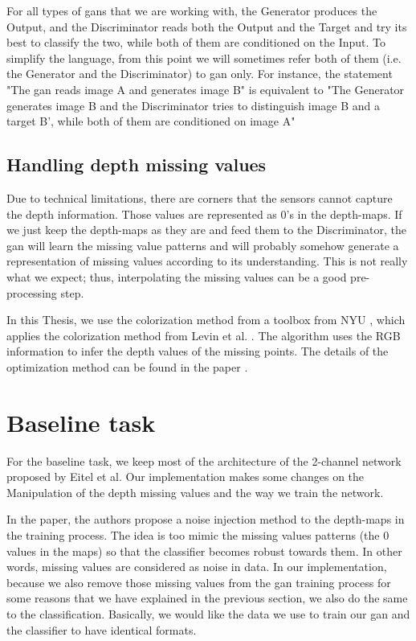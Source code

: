 For all types of \acrshort{gan}s that we are working with, the Generator produces the
Output, and the Discriminator reads both the Output and the Target and try its best to
classify the two, while both of them are conditioned on the Input. To simplify the
language, from this point we will sometimes refer both of them (i.e. the Generator and the
Discriminator) to \acrshort{gan} only. For instance, the statement "The \acrshort{gan} reads
image A and generates image B" is equivalent to "The Generator generates image B and the
Discriminator tries to distinguish image B and a target B', while both of them are
conditioned on image A"

\subsection{Handling depth missing values }

Due to technical limitations, there are corners that the sensors cannot capture the depth
information. Those values are represented as 0's in the depth-maps. If we just keep the
depth-maps as they are and feed them to the Discriminator, the \acrshort{gan} will learn
the missing value patterns and will probably somehow generate a representation of missing
values according to its understanding. This is not really what we expect; thus,
interpolating the missing values can be a good pre-processing step.

In this Thesis, we use the colorization method from a toolbox from NYU \cite{nyu_dataset},
which applies the colorization method from Levin et al. \cite{levin_colorization}. The
algorithm uses the RGB information to infer the depth values of the missing points. The
details of the optimization method can be found in the paper \cite{levin_colorization}.

\section{Baseline task}

For the baseline task, we keep most of the architecture of the 2-channel network proposed
by Eitel et al. Our implementation makes some changes on the Manipulation of the depth
missing values and the way we train the network.

In the paper, the authors propose a noise injection method to the depth-maps in the
training process. The idea is too mimic the missing values patterns (the 0 values in the
maps) so that the classifier becomes robust towards them. In other words, missing values
are considered as noise in data. In our implementation, because we also remove those
missing values from the \acrshort{gan} training process for some reasons that we have
explained in the previous section, we also do the same to the classification. Basically,
we would like the data we use to train our \acrshort{gan} and the classifier to have
identical formats.

